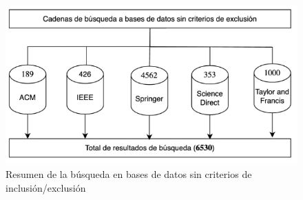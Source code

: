 \begin{figure}[H]
    \centering
    \includegraphics[width=\textwidth] {tablas-images/cp2/bases-sin-criterio.png}
    \caption{Resumen de la búsqueda en bases de datos sin criterios de inclusión/exclusión}\label{fig:tabla-resumen-busqueda}
\end{figure}